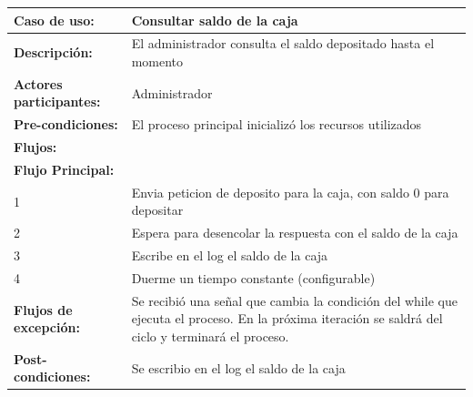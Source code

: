 \documentclass[12pt,a4paper,spanish]{article}
\begin{document}
	\begin{tabular}{|p{4cm}|p{12cm}|}
    \hline
    \textbf{Caso de uso:} & Consultar saldo de la caja \\
    \hline
    \textbf{Descripción:} &  El administrador consulta el saldo depositado hasta el momento\\
    \hline
    \textbf{Actores participantes:} & Administrador\\
    \hline
 
    \textbf{Pre-condiciones:} &  El proceso principal inicializó los recursos utilizados\\
    \hline
    \hline
    \textbf{Flujos:} &\\
    \hline
	\textbf{Flujo Principal:} &\\ 

	\hline
	1 & Envia peticion de deposito para la caja, con saldo 0 para depositar\\
	\hline
	2 & Espera para desencolar la respuesta con el saldo de la caja\\
	\hline
	3 & Escribe en el log el saldo de la caja\\
	\hline
	4 & Duerme un tiempo constante (configurable)\\
	\hline
	\textbf{Flujos de excepción:} & Se recibió una señal que cambia la condición del while que ejecuta el proceso. En la próxima iteración se saldrá del ciclo y terminará el proceso.\\
    \hline

    \hline
	\textbf{Post-condiciones:} & Se escribio en el log el saldo de la caja\\
	\hline
	\end{tabular}

	\newpage
\end{document}
